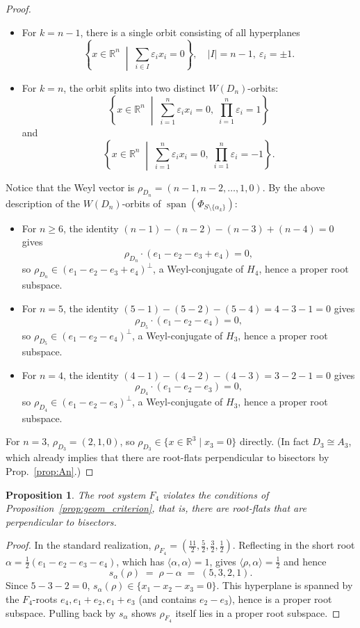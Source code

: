 \documentclass[11pt]{amsart}
\DeclareMathOperator{\Span}{span}
\theoremstyle{plain}
\newtheorem{prop}[thm]{Proposition}
\theoremstyle{definition}
\theoremstyle{remark}
\begin{document}
\begin{proof}
\begin{itemize}
			\item For $k = n-1$, there is a single orbit consisting of all hyperplanes
			\[
			\left\{
			x \in \mathbb{R}^n \;\middle|\;
			\sum_{i \in I} \varepsilon_i x_i = 0
			\right\},
			\quad |I| = n-1,\ \varepsilon_i = \pm1.
			\]
			
			\item For $k = n$, the orbit splits into two distinct $W(D_n)$-orbits:
			\[
			\left\{
			x \in \mathbb{R}^n \;\middle|\;
			\sum_{i=1}^n \varepsilon_i x_i = 0,\;
			\prod_{i=1}^n \varepsilon_i = 1
			\right\}
			\]
			and
			\[
			\left\{
			x \in \mathbb{R}^n \;\middle|\;
			\sum_{i=1}^n \varepsilon_i x_i = 0,\;
			\prod_{i=1}^n \varepsilon_i = -1
			\right\}.
			\]
		\end{itemize}
		
		Notice that the Weyl vector is $\rho_{D_n} = (n-1, n-2, \dots, 1, 0)$.  By the above description of the $W(D_n)$-orbits of $\Span(\Phi_{S\setminus\{\alpha_k\}})$:
		\begin{itemize}
			\item For $n\ge 6$, the identity $(n-1)-(n-2)-(n-3)+(n-4)=0$ gives
			\[
			\rho_{D_n}\cdot(e_1-e_2-e_3+e_4)=0,
			\]
			so $\rho_{D_n}\in(e_1-e_2-e_3+e_4)^\perp$, a Weyl-conjugate of $H_4$, hence a proper root subspace.
			\item For $n=5$, the identity $(5-1)-(5-2)-(5-4)=4-3-1=0$ gives
			\[
			\rho_{D_5}\cdot(e_1-e_2-e_4)=0,
			\]
			so $\rho_{D_5}\in(e_1-e_2-e_4)^\perp$, a Weyl-conjugate of $H_3$, hence a proper root subspace.
			\item For $n=4$, the identity $(4-1)-(4-2)-(4-3)=3-2-1=0$ gives
			\[
			\rho_{D_4}\cdot(e_1-e_2-e_3)=0,
			\]
			so $\rho_{D_4}\in(e_1-e_2-e_3)^\perp$, a Weyl-conjugate of $H_3$, hence a proper root subspace.
		\end{itemize}
		
		For $n=3$, $\rho_{D_3} = (2,1,0)$, so $\rho_{D_3}\in\{x \in \mathbb{R}^3 \mid x_3 = 0\}$ directly. (In fact $D_3\cong A_3$, which already implies that there are root-flats perpendicular to bisectors by Prop.~\ref{prop:An}.)
	\end{proof}
	
	
	\begin{prop}
		\label{prop:F4}
		The root system $F_4$ violates the conditions of Proposition~\ref{prop:geom_criterion}, that is, there are root-flats that are perpendicular to bisectors.
	\end{prop}
	
	\begin{proof}
		In the standard realization, $\rho_{F_4}=(\tfrac{11}{2},\tfrac52,\tfrac32,\tfrac12)$.
		Reflecting in the short root $\alpha=\tfrac12(e_1-e_2-e_3-e_4)$,
		which has $\langle\alpha,\alpha\rangle=1$, gives
		$\langle\rho,\alpha\rangle=\tfrac12$ and hence
		\[
		s_\alpha(\rho) \;=\; \rho - \alpha \;=\; (5,3,2,1).
		\]
		Since $5-3-2=0$, $s_\alpha(\rho)\in\{x_1-x_2-x_3=0\}$.  This hyperplane
		is spanned by the $F_4$-roots $e_4,e_1+e_2,e_1+e_3$ (and contains
		$e_2-e_3$), hence is a proper root subspace.  Pulling back by $s_\alpha$
		shows $\rho_{F_4}$ itself lies in a proper root subspace.
	\end{proof}
	
\end{document}
